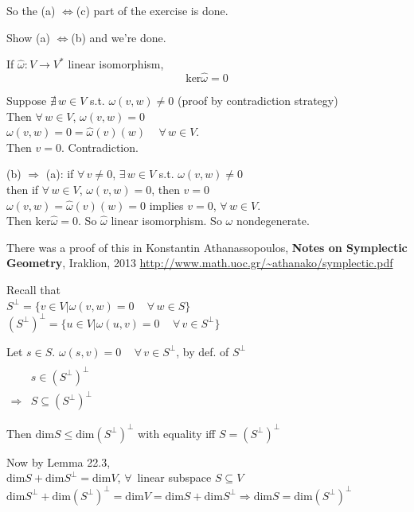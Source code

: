 So the (a) $\Longleftrightarrow$(c) part of the exercise is done.  

Show (a) $\Longleftrightarrow$(b) and we're done.

If $\widehat{\omega}:V\to V^*$ linear isomorphism,  
\[
\text{ker}\widehat{\omega}=0
\]

Suppose $\nexists \, w \in V$ s.t. $\omega(v,w)\neq 0$ (proof by contradiction strategy) \\
Then $\forall \, w \in V$, $\omega(v,w) =0$  \\
$\omega(v,w) = 0 = \widehat{\omega}(v)(w) \quad \, \forall \, w \in V$.  \\
Then $v=0$.  Contradiction.  

(b) $\Longrightarrow $ (a): if $\forall \, v \neq 0$, $\exists \, w \in V$ s.t. $\omega(v,w) \neq 0$ \\
then if $\forall \, w \in V$, $\omega(v,w) =0$, then $v=0$ \\
$\omega(v,w) = \widehat{\omega}(v)(w) = 0$ implies $v=0$, $\forall \, w \in V$.  \\
Then $\text{ker}\widehat{\omega}=0$.  So $\widehat{\omega}$ linear isomorphism.  So $\omega$ nondegenerate.  

 There was a proof of this in Konstantin Athanassopoulos, \textbf{Notes on Symplectic Geometry}, Iraklion, 2013
\url{http://www.math.uoc.gr/~athanako/symplectic.pdf}

Recall that \\
$S^{\perp} = \lbrace v \in V | \omega(v,w) =0 \quad \, \forall \, w \in S \rbrace$ \\
$(S^{\perp})^{\perp} = \lbrace u \in V | \omega(u,v)=0 \quad \, \forall \, v \in S^{\perp}\rbrace$

Let $s\in S$.  $\omega(s,v)=0 \quad \, \forall \, v \in S^{\perp}$, by def. of $S^{\perp}$ \\
$\begin{aligned} & \quad \\
  & s\in (S^{\perp})^{\perp} \\ 
  \Longrightarrow & S \subseteq (S^{\perp})^{\perp} \end{aligned}$

Then $\text{dim}S \leq \text{dim}(S^{\perp})^{\perp}$ with equality iff $S= (S^{\perp})^{\perp}$

Now by Lemma 22.3, \\
$\text{dim}S + \text{dim}S^{\perp} = \text{dim}V$, $\forall \, $ linear subspace $S\subseteq V$ \\
$\text{dim}S^{\perp} + \text{dim}(S^{\perp})^{\perp} = \text{dim}V = \text{dim}S + \text{dim}S^{\perp} \Longrightarrow \text{dim}S = \text{dim}(S^{\perp})^{\perp}$ \\
 
